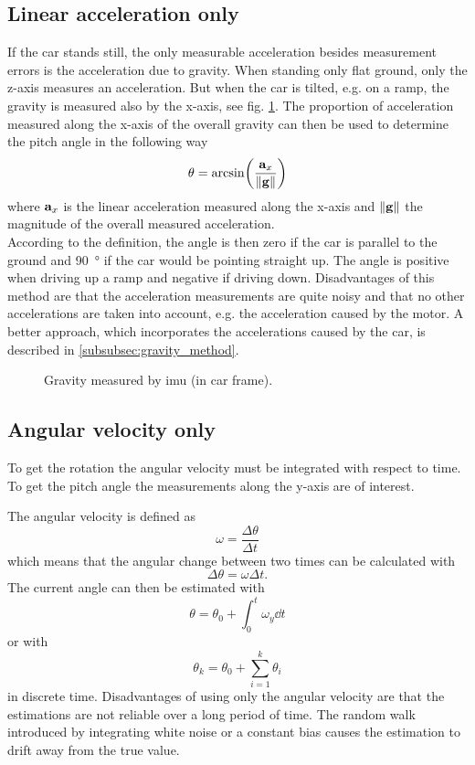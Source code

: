 \subsection{Linear acceleration only}
If the car stands still, the only measurable acceleration besides measurement errors is the acceleration due to gravity.
When standing only flat ground, only the z-axis measures an acceleration.
But when the car is tilted, e.g. on a ramp, the gravity is measured also by the x-axis, see fig. \ref{fig:tikz_car_gravity1}.
The proportion of acceleration measured along the x-axis of the overall gravity can then be used to determine the pitch angle in the following way
\begin{equation}
    \theta = \arcsin(\frac{\vb{a}_x}{\norm{\vb{g}}})
\end{equation}
where $\vb{a}_x$ is the linear acceleration measured along the x-axis and $\norm{\vb{g}}$ the magnitude of the overall measured acceleration.\\
According to the definition, the angle is then zero if the car is parallel to the ground and \SI{90}{\degree} if the car would be pointing straight up.
The angle is positive when driving up a ramp and negative if driving down.
Disadvantages of this method are that the acceleration measurements are quite noisy and that no other accelerations are taken into account, e.g. the acceleration caused by the motor.
A better approach, which incorporates the accelerations caused by the car, is described in \ref{subsubsec:gravity_method}.
\begin{figure}[htpb]
    \centering
    
    \caption{Gravity measured by \acrshort{imu} (in car frame).}
    \label{fig:tikz_car_gravity1}
\end{figure}

\subsection{Angular velocity only}
To get the rotation the angular velocity must be integrated with respect to time.
To get the pitch angle the measurements along the y-axis are of interest.

The angular velocity is defined as
\begin{equation}
    \omega = \frac{\Delta\theta}{\Delta t}
\end{equation}
which means that the angular change between two times can be calculated with
\begin{equation}
    \Delta\theta = \omega\Delta t.
\end{equation}
The current angle can then be estimated with
\begin{equation}
    \theta = \theta_0 + \int_0^t \omega_y \dd{t}
\end{equation}
or with
\begin{equation}
    \theta_k = \theta_0 + \sum_{i = 1}^k \theta_i
\end{equation}
in discrete time.
Disadvantages of using only the angular velocity are that the estimations are not reliable over a long period of time.
The random walk introduced by integrating white noise or a constant bias causes the estimation to drift away from the true value.


